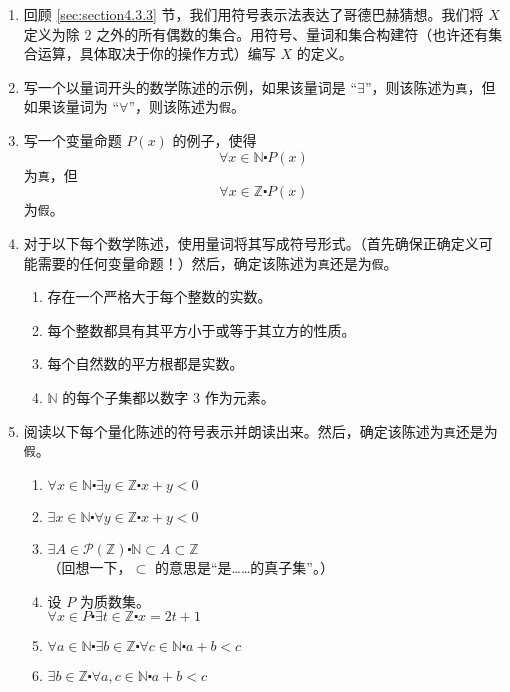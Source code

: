 \begin{enumerate}[label=(\arabic*)]
    \item 回顾 \ref{sec:section4.3.3} 节，我们用符号表示法表达了哥德巴赫猜想。我们将 $X$ 定义为除 $2$ 之外的所有偶数的集合。用符号、量词和集合构建符（也许还有集合运算，具体取决于你的操作方式）编写 $X$ 的定义。
    \item 写一个以量词开头的数学陈述的示例，如果该量词是 ``$\exists$''，则该陈述为\verb|真|，但如果该量词为  ``$\forall$''，则该陈述为\verb|假|。
    \item 写一个变量命题 $P(x)$ 的例子，使得
        \[\forall x \in \mathbb{N} \centerdot P(x)\]
        为\verb|真|，但
        \[\forall x \in \mathbb{Z} \centerdot P(x)\]
        为\verb|假|。
    \item 对于以下每个数学陈述，使用量词将其写成符号形式。（首先确保正确定义可能需要的任何变量命题！）然后，确定该陈述为\verb|真|还是为\verb|假|。
        \begin{enumerate}[label=(\alph*)]
            \item 存在一个严格大于每个整数的实数。
            \item 每个整数都具有其平方小于或等于其立方的性质。
            \item 每个自然数的平方根都是实数。
            \item $\mathbb{N}$ 的每个子集都以数字 $3$ 作为元素。
        \end{enumerate} 
    \item 阅读以下每个量化陈述的符号表示并朗读出来。然后，确定该陈述为\verb|真|还是为\verb|假|。
        \begin{enumerate}[label=(\alph*)]
            \item $\forall x \in \mathbb{N} \centerdot \exists y \in \mathbb{Z} \centerdot x + y < 0$
            \item $\exists x \in \mathbb{N} \centerdot \forall y \in \mathbb{Z} \centerdot x + y < 0$
            \item $\exists A \in \mathcal{P}(\mathbb{Z}) \centerdot \mathbb{N} \subset A \subset \mathbb{Z}$\\（回想一下，$⊂$ 的意思是``是……的真子集''。）
            \item 设 $P$ 为质数集。\\
                    $\forall x \in P \centerdot \exists t \in \mathbb{Z} \centerdot x = 2t + 1$
            \item $\forall a \in \mathbb{N} \centerdot \exists b \in \mathbb{Z} \centerdot \forall c \in \mathbb{N} \centerdot a + b < c$
            \item $\exists b \in \mathbb{Z} \centerdot \forall a, c \in \mathbb{N} \centerdot a + b < c$
        \end{enumerate} 
\end{enumerate}   